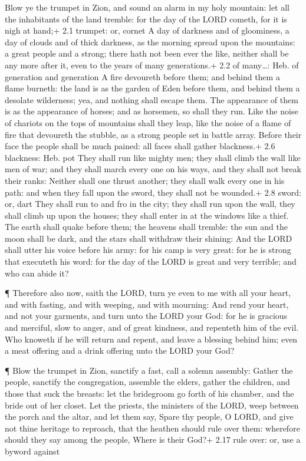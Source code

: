  Blow ye the trumpet in Zion, and sound an alarm in my holy
mountain: let all the inhabitants of the land tremble: for the day of
the LORD cometh, for it is nigh at hand;+ 2.1 trumpet: or, cornet
 A day of darkness and of gloominess, a day of clouds and of
thick darkness, as the morning spread upon the mountains: a great people
and a strong; there hath not been ever the like, neither shall be any
more after it, even to the years of many generations.+ 2.2 of
many\ldots: Heb. of generation and generation  A fire
devoureth before them; and behind them a flame burneth: the land is as
the garden of Eden before them, and behind them a desolate wilderness;
yea, and nothing shall escape them.  The appearance of them
is as the appearance of horses; and as horsemen, so shall they run.
 Like the noise of chariots on the tops of mountains shall
they leap, like the noise of a flame of fire that devoureth the stubble,
as a strong people set in battle array.  Before their face
the people shall be much pained: all faces shall gather blackness.+ 2.6
blackness: Heb. pot  They shall run like mighty men; they
shall climb the wall like men of war; and they shall march every one on
his ways, and they shall not break their ranks:  Neither
shall one thrust another; they shall walk every one in his path: and
when they fall upon the sword, they shall not be wounded.+ 2.8 sword:
or, dart  They shall run to and fro in the city; they shall
run upon the wall, they shall climb up upon the houses; they shall enter
in at the windows like a thief.  The earth shall quake
before them; the heavens shall tremble: the sun and the moon shall be
dark, and the stars shall withdraw their shining:  And the
LORD shall utter his voice before his army: for his camp is very great:
for he is strong that executeth his word: for the day of the LORD is
great and very terrible; and who can abide it?

 ¶ Therefore also now, saith the LORD, turn ye even to me
with all your heart, and with fasting, and with weeping, and with
mourning:  And rend your heart, and not your garments, and
turn unto the LORD your God: for he is gracious and merciful, slow to
anger, and of great kindness, and repenteth him of the evil.
 Who knoweth if he will return and repent, and leave a
blessing behind him; even a meat offering and a drink offering unto the
LORD your God?

 ¶ Blow the trumpet in Zion, sanctify a fast, call a solemn
assembly:  Gather the people, sanctify the congregation,
assemble the elders, gather the children, and those that suck the
breasts: let the bridegroom go forth of his chamber, and the bride out
of her closet.  Let the priests, the ministers of the LORD,
weep between the porch and the altar, and let them say, Spare thy
people, O LORD, and give not thine heritage to reproach, that the
heathen should rule over them: wherefore should they say among the
people, Where is their God?+ 2.17 rule over: or, use a byword against

